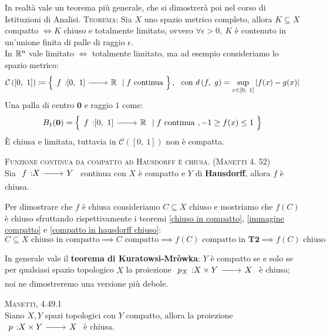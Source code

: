 \begin{digression}
In realtà vale un teorema più generale, che si dimostrerà poi nel corso di Istituzioni di Analisi.
\textsc{Teorema:} Sia $X$ uno spazio metrico completo, allora $K\subseteq X$ compatto $\iff K$ chiuso e totalmente limitato, ovvero $\forall\epsilon >0, \ K$ è contenuto in un'unione finita di palle di raggio $\epsilon$.\\ 
In $\mathbb{R}^n$ vale limitato $\iff$ totalmente limitato, ma ad esempio consideriamo lo spazio metrico:
	\begin{gather*}
		\mathcal{C}\left( [0, \ 1] \right) \coloneqq \left\{ \funz f {[0,\ 1]} \realset \mid f \text{ continua } \right\},  \ \ \text{con } \mvf{d}{f}{g} =\sup_{x\in [0, \ 1]} |f(x)-g(x)|
	\end{gather*}
Una palla di centro $\mathbf{0}$ e raggio $1$ come:
\begin{equation*}
	B_1(\mathbf{0})=\left\{ \funz f {[0,\ 1]} \realset \mid f \text{ continua }, -1\geq f(x) \leq 1 \ \right\}
\end{equation*}
È chiusa e limitata, tuttavia in $	\mathcal{C}\left( [0, \ 1] \right)$ non è compatta.
\end{digression}
\begin{theorema}\textsc{Funzione continua da compatto ad Hausdorff è chiusa}. \textsc{(Manetti 4. 52)} \label{da compatto in T_2 è chiuso} \\
	Sia $\funz f X Y$ continua con $X$ è compatto e $Y$ di \textbf{Hausdorff}, allora $f$ è chiusa.
\end{theorema}
\begin{demonstration}
	Per dimostrare che $f$ è chiusa consideriamo $C\subseteq X$ chiuso e mostriamo che $f(C)$ è chiuso sfruttando rispettivamente i teoremi \ref{chiuso in compatto}, \ref{immagine compatto} e \ref{compatto in hausdorff chiuso}:
		\begin{equation*}
			C\subseteq X \text{ chiuso in compatto} \implies C \text{ compatto} \implies f(C) \text{ compatto in } \textbf{T2} \implies f(C) \text{ chiuso}
		\end{equation*}
\end{demonstration}
In generale vale il \textbf{teorema di Kuratowsi-Mròwka}: $Y$ è compatto se e solo se per qualsiasi spazio topologico $X$ la proiezione $\funz {p_X} {X\times Y} X$ è chiusa; noi ne dimostreremo una versione più debole.
\begin{theorema} \textsc{Manetti, 4.49.1} \\
	Siano $X,Y$ spazi topologici con $Y$ compatto, allora la proiezione $\funz p {X\times Y} X$ è chiusa.
\end{theorema}
